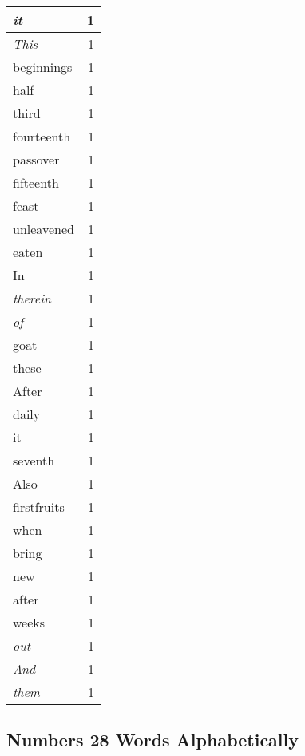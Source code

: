 \begin{center}
\begin{longtable}{l|r}
\emph{it} & 1\\ \hline 
\emph{This} & 1\\ \hline 
beginnings & 1\\ \hline 
half & 1\\ \hline 
third & 1\\ \hline 
fourteenth & 1\\ \hline 
passover & 1\\ \hline 
fifteenth & 1\\ \hline 
feast & 1\\ \hline 
unleavened & 1\\ \hline 
eaten & 1\\ \hline 
In & 1\\ \hline 
\emph{therein} & 1\\ \hline 
\emph{of} & 1\\ \hline 
goat & 1\\ \hline 
these & 1\\ \hline 
After & 1\\ \hline 
daily & 1\\ \hline 
it & 1\\ \hline 
seventh & 1\\ \hline 
Also & 1\\ \hline 
firstfruits & 1\\ \hline 
when & 1\\ \hline 
bring & 1\\ \hline 
new & 1\\ \hline 
after & 1\\ \hline 
weeks & 1\\ \hline 
\emph{out} & 1\\ \hline 
\emph{And} & 1\\ \hline 
\emph{them} & 1\\ \hline 
\end{longtable}
\end{center}





\subsection{Numbers 28 Words Alphabetically}


\normalsize
 
